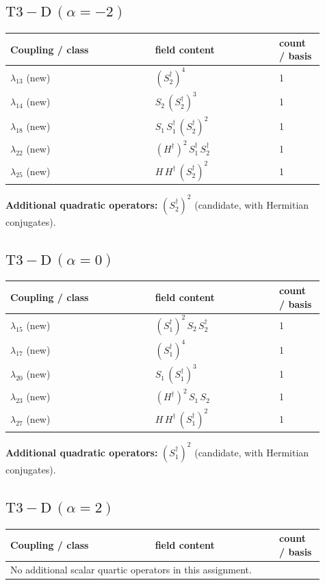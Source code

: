 \documentclass[9pt,a4paper]{article}
\begin{document}
\subsection*{$ \mathrm{T3-D}\,(\alpha=-2) $}
\begin{longtable}{@{}p{0.42\linewidth}p{0.36\linewidth}p{0.13\linewidth}@{}}
\toprule
Coupling / class & field content & count / basis\\
\midrule
\endhead
$\lambda_{13}$ (new) & $\left(S_2^\dagger\right)^{4}$ & 1 \\
$\lambda_{14}$ (new) & $S_2\, \left(S_2^\dagger\right)^{3}$ & 1 \\
$\lambda_{18}$ (new) & $S_1\, S_1^\dagger\, \left(S_2^\dagger\right)^{2}$ & 1 \\
$\lambda_{22}$ (new) & $\left(H^\dagger\right)^{2}\, S_1^\dagger\, S_2^\dagger$ & 1 \\
$\lambda_{25}$ (new) & $H\, H^\dagger\, \left(S_2^\dagger\right)^{2}$ & 1 \\
\bottomrule
\end{longtable}
\textbf{Additional quadratic operators:}
$\left(S_2^\dagger\right)^{2}$ (candidate, with Hermitian conjugates).
\subsection*{$ \mathrm{T3-D}\,(\alpha=0) $}
\begin{longtable}{@{}p{0.42\linewidth}p{0.36\linewidth}p{0.13\linewidth}@{}}
\toprule
Coupling / class & field content & count / basis\\
\midrule
\endhead
$\lambda_{15}$ (new) & $\left(S_1^\dagger\right)^{2}\, S_2\, S_2^\dagger$ & 1 \\
$\lambda_{17}$ (new) & $\left(S_1^\dagger\right)^{4}$ & 1 \\
$\lambda_{20}$ (new) & $S_1\, \left(S_1^\dagger\right)^{3}$ & 1 \\
$\lambda_{23}$ (new) & $\left(H^\dagger\right)^{2}\, S_1\, S_2$ & 1 \\
$\lambda_{27}$ (new) & $H\, H^\dagger\, \left(S_1^\dagger\right)^{2}$ & 1 \\
\bottomrule
\end{longtable}
\textbf{Additional quadratic operators:}
$\left(S_1^\dagger\right)^{2}$ (candidate, with Hermitian conjugates).
\subsection*{$ \mathrm{T3-D}\,(\alpha=2) $}
\begin{longtable}{@{}p{0.42\linewidth}p{0.36\linewidth}p{0.13\linewidth}@{}}
\toprule
Coupling / class & field content & count / basis\\
\midrule
\endhead
\multicolumn{3}{l}{No additional scalar quartic operators in this assignment.}\\
\bottomrule
\end{longtable}
\end{document}
